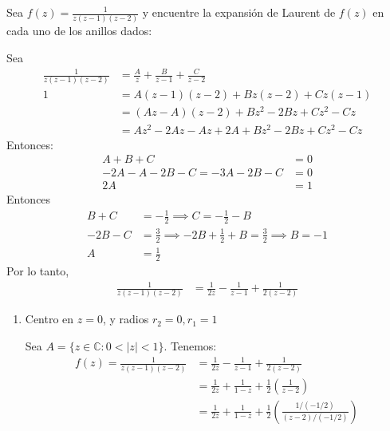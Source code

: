 





\begin{problema}
    Sea $f(z)=\frac{1}{z(z-1)(z-2)}$ y encuentre la expansión de Laurent de $f(z)$ en cada uno de los anillos dados:
    \begin{cajita}
        Sea 
        \begin{align*}
            \frac{1}{z(z-1)(z-2)} &= \frac{A}{z}+\frac{B}{z-1}+\frac{C}{z-2}\\
            1 &= A(z-1)(z-2) + Bz(z-2)+Cz(z-1)\\
              &= (Az-A)(z-2)+Bz^2-2Bz+Cz^2-Cz\\
              &= Az^2-2Az-Az+2A+ Bz^2-2Bz+Cz^2-Cz
        \end{align*}
        Entonces: 
        \begin{align*}
            A+B+C &= 0\\
            -2A -A -2B-C= -3A -2B-C&=0\\
            2A &=1
        \end{align*}
         Entonces
         \begin{align*}
            B+C &= -\frac{1}{2}\implies C=-\frac{1}{2}-B\\
           -2B-C &= \frac{3}{2}\implies-2B+\frac{1}{2}+B = \frac{3}{2}\implies B= -1 \\
            A &= \frac{1}{2}
         \end{align*}
         Por lo tanto, 
         \begin{align*}
            \frac{1}{z(z-1)(z-2)} &= \frac{1}{2z}-\frac{1}{z-1}+\frac{1}{2(z-2)}
         \end{align*}
    \end{cajita}
    \newpage
    \begin{enumerate}
        \item Centro en $z=0$, y radios $r_2=0, r_1=1$
        \begin{sol}
            Sea $A=\{z\in\mathbb{C}: 0<|z|<1\}$. Tenemos: 
            \begin{align*}
                f(z)=\frac{1}{z(z-1)(z-2)} &= \frac{1}{2z}-\frac{1}{z-1}+\frac{1}{2(z-2)}\\
                &= \frac{1}{2z}+\frac{1}{1-z}+\frac{1}{2}\left(\frac{1}{z-2}\right)\\
                &= \frac{1}{2z}+\frac{1}{1-z}+\frac{1}{2}\left(\frac{1\big/(-1/2)}{(z-2)\big/ (-1/2)}\right)\\

\end{align*}
\end{sol}
\end{enumerate}
\end{problema}

